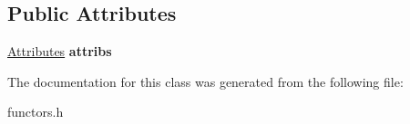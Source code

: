 \subsection*{Public Attributes}
\begin{DoxyCompactItemize}
\item 
\hyperlink{classAttributes}{Attributes} {\bfseries attribs}\hypertarget{classTFunctor_ac5ff72e32fb600021a5a9bcfcf2e3791}{}\label{classTFunctor_ac5ff72e32fb600021a5a9bcfcf2e3791}

\end{DoxyCompactItemize}


The documentation for this class was generated from the following file\+:\begin{DoxyCompactItemize}
\item 
functors.\+h\end{DoxyCompactItemize}
